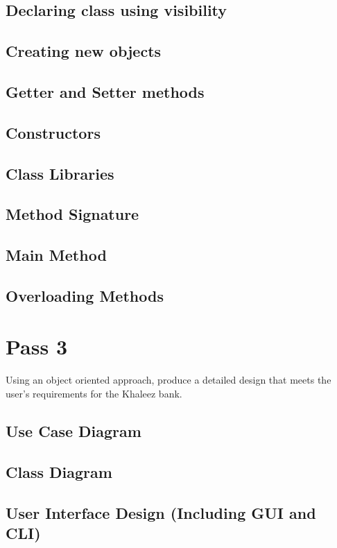\documentclass[twocolumn, twoside, titlepage]{article}
\begin{document}
\subsection{Declaring class using visibility}

\subsection{Creating new objects}

\subsection{Getter and Setter methods}

\subsection{Constructors}

\subsection{Class Libraries}

\subsection{Method Signature}

\subsection{Main Method}

\subsection{Overloading Methods}


\section{Pass 3}
Using an object oriented approach, produce a detailed design that meets the user’s requirements for the Khaleez bank. 
\subsection{Use Case Diagram}

\subsection{Class Diagram}

\subsection{User Interface Design (Including GUI and CLI)}
\end{document}
